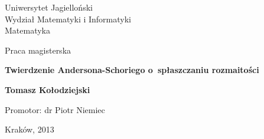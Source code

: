 \pagestyle{empty}
\sffamily

\noindent
\begin{center}
    \Large
    Uniwersytet Jagielloński\\
    Wydział Matematyki i Informatyki\\
    Matematyka
\end{center}

\vfill\vfill
\begin{center}
    \large
    Praca magisterska\\
\end{center}

\vfill
\begin{center}
    \Huge\bfseries
    Twierdzenie Andersona-Schoriego o~spłaszczaniu rozmaitości
\end{center}

\vfill
\begin{center}
    \Huge\bfseries
    Tomasz Kołodziejski
\end{center}

\vfill\vfill\vfill
\begin{center}
    \Large
    Promotor: dr Piotr Niemiec
\end{center}

\vfill
\begin{center}
\large
    Kraków, 2013
\end{center}

\cleardoublepage

\normalfont
\tableofcontents
